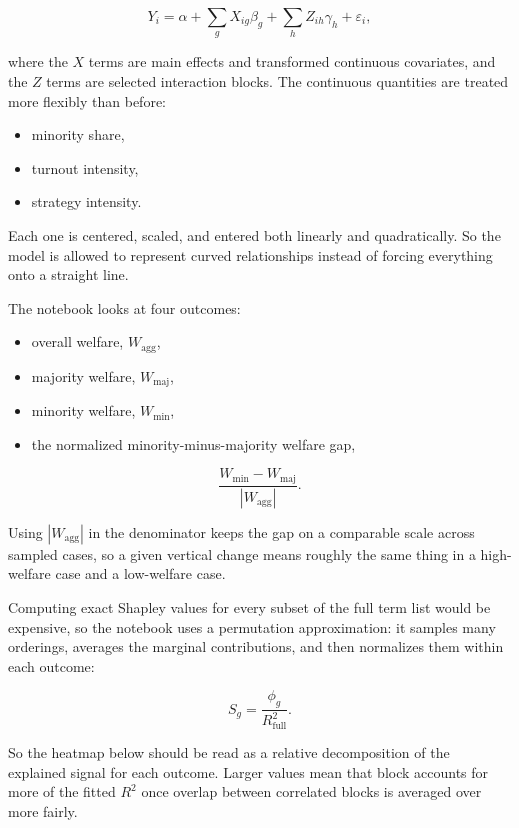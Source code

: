 \documentclass[11pt]{article}
\providecommand{\tightlist}{%
      \setlength{\itemsep}{0pt}\setlength{\parskip}{0pt}}
\begin{document}
\[
Y_i = \alpha + \sum_g X_{ig} \beta_g + \sum_h Z_{ih} \gamma_h + \varepsilon_i,
\]

where the \(X\) terms are main effects and transformed continuous
covariates, and the \(Z\) terms are selected interaction blocks. The
continuous quantities are treated more flexibly than before:

\begin{itemize}
\tightlist
\item
  minority share,
\item
  turnout intensity,
\item
  strategy intensity.
\end{itemize}

Each one is centered, scaled, and entered both linearly and
quadratically. So the model is allowed to represent curved relationships
instead of forcing everything onto a straight line.

The notebook looks at four outcomes:

\begin{itemize}
\tightlist
\item
  overall welfare, \(W_{\mathrm{agg}}\),
\item
  majority welfare, \(W_{\mathrm{maj}}\),
\item
  minority welfare, \(W_{\mathrm{min}}\),
\item
  the normalized minority-minus-majority welfare gap,
\end{itemize}

\[
\frac{W_{\mathrm{min}} - W_{\mathrm{maj}}}{|W_{\mathrm{agg}}|}.
\]

Using \(|W_{\mathrm{agg}}|\) in the denominator keeps the gap on a
comparable scale across sampled cases, so a given vertical change means
roughly the same thing in a high-welfare case and a low-welfare case.

Computing exact Shapley values for every subset of the full term list
would be expensive, so the notebook uses a permutation approximation: it
samples many orderings, averages the marginal contributions, and then
normalizes them within each outcome:

\[
S_g = \frac{\phi_g}{R^2_{\mathrm{full}}}.
\]

So the heatmap below should be read as a relative decomposition of the
explained signal for each outcome. Larger values mean that block
accounts for more of the fitted \(R^2\) once overlap between correlated
blocks is averaged over more fairly.
\end{document}
